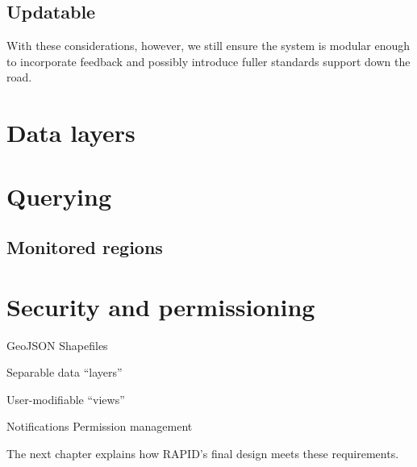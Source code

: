 \subsection{Updatable}

With these considerations, however, we still ensure the system is modular enough to incorporate feedback and possibly introduce fuller standards support down the road.



\section{Data layers}

\section{Querying}
\subsection{Monitored regions}


\section{Security and permissioning}





GeoJSON
Shapefiles


Separable data ``layers''

User-modifiable ``views''


Notifications
Permission management


The next chapter explains how RAPID's final design meets these requirements.

